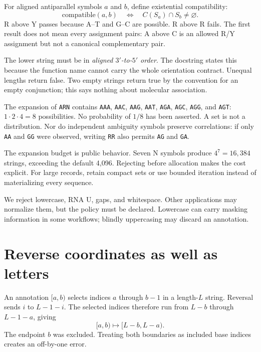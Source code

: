 For aligned antiparallel symbols $a$ and $b$, define existential compatibility:
\begin{equation}
\mathrm{compatible}(a,b)
\quad\Longleftrightarrow\quad C(S_a)\cap S_b\ne\varnothing.
\label{eq:compat}
\end{equation}
R above Y passes because A--T and G--C are possible. R above R fails.
The first result does not mean every assignment pairs: A above C is an
allowed R/Y assignment but not a canonical complementary pair.


The lower string must be in \emph{aligned $3'$-to-$5'$ order}.
The docstring states this because the function name cannot carry the whole
orientation contract. Unequal lengths return false. Two empty strings return
true by the convention for an empty conjunction; this says nothing about
molecular association.

The expansion of \texttt{ARN} contains \texttt{AAA}, \texttt{AAC},
\texttt{AAG}, \texttt{AAT}, \texttt{AGA}, \texttt{AGC}, \texttt{AGG}, and
\texttt{AGT}: $1\cdot2\cdot4=8$ possibilities. No probability of $1/8$ has
been asserted. A set is not a distribution. Nor do independent ambiguity
symbols preserve correlations: if only \texttt{AA} and \texttt{GG} were
observed, writing \texttt{RR} also permits \texttt{AG} and \texttt{GA}.


The expansion budget is public behavior. Seven N symbols produce
$4^7=16{,}384$ strings, exceeding the default 4,096. Rejecting before
allocation makes the cost explicit. For large records, retain compact sets
or use bounded iteration instead of materializing every sequence.

We reject lowercase, RNA U, gaps, and whitespace. Other applications may
normalize them, but the policy must be declared. Lowercase can carry masking
information in some workflows; blindly uppercasing may discard an annotation.

\section{Reverse coordinates as well as letters}

An annotation $[a,b)$ selects indices $a$ through $b-1$ in a length-$L$
string. Reversal sends $i$ to $L-1-i$. The selected indices therefore run
from $L-b$ through $L-1-a$, giving
\begin{equation}
[a,b)\longmapsto[L-b,L-a).
\label{eq:interval}
\end{equation}
The endpoint $b$ was excluded. Treating both boundaries as included base
indices creates an off-by-one error.

